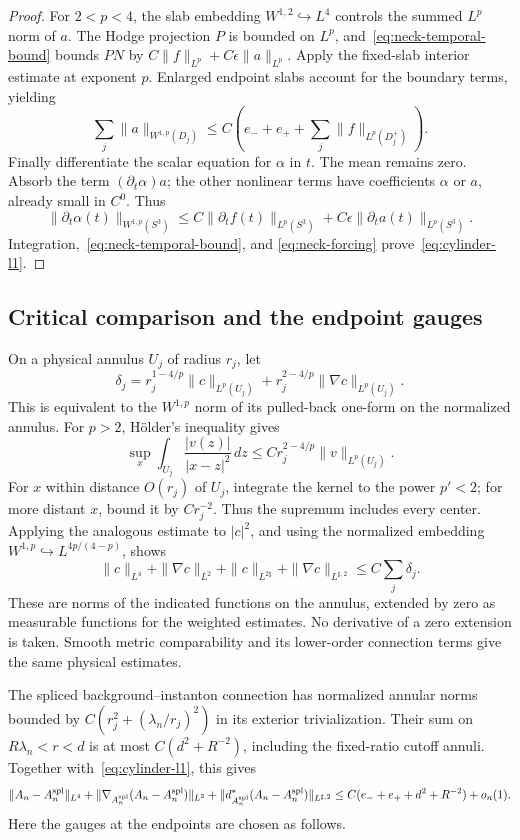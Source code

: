 \documentclass[11pt]{amsart}
\theoremstyle{definition}
\theoremstyle{remark}
\theoremstyle{plain}
\begin{document}
\begin{proof}
For $2<p<4$, the slab embedding $W^{1,2}\hookrightarrow L^4$
controls the summed $L^p$ norm of $a$.  The Hodge projection $P$
is bounded on $L^p$, and~\eqref{eq:neck-temporal-bound} bounds
$PN$ by $C\|f\|_{L^p}+C\epsilon\|a\|_{L^p}$.
Apply the fixed-slab interior estimate at exponent $p$.  Enlarged
endpoint slabs account for the boundary terms, yielding
\[
 \sum_j\|a\|_{W^{1,p}(D_j)}
 \le C\left(e_-+e_++\sum_j\|f\|_{L^p(D_j^+)}\right).
\]
Finally differentiate the scalar equation for $\alpha$ in $t$.
The mean remains zero.  Absorb the term $(\partial_t\alpha)a$;
the other nonlinear terms have coefficients $\alpha$ or $a$,
already small in $C^0$.  Thus
\[
 \|\partial_t\alpha(t)\|_{W^{1,p}(S^3)}
 \le C\|\partial_tf(t)\|_{L^p(S^3)}
       +C\epsilon\|\partial_ta(t)\|_{L^p(S^3)}.
\]
Integration,~\eqref{eq:neck-temporal-bound}, and
\eqref{eq:neck-forcing} prove~\eqref{eq:cylinder-l1}.
\end{proof}

\subsection{Critical comparison and the endpoint gauges}
On a physical annulus $U_j$ of radius $r_j$, let
\[
 \delta_j=r_j^{1-4/p}\|c\|_{L^p(U_j)}
          +r_j^{2-4/p}\|\nabla c\|_{L^p(U_j)}.
\]
This is equivalent to the $W^{1,p}$ norm of its pulled-back one-form
on the normalized annulus.  For $p>2$, H\"older's inequality gives
\begin{equation}\label{eq:neck-weighted-shell}
 \sup_x\int_{U_j}\frac{|v(z)|}{|x-z|^2}\,dz
 \le Cr_j^{2-4/p}\|v\|_{L^p(U_j)}.
\end{equation}
For $x$ within distance $O(r_j)$ of $U_j$, integrate the kernel
to the power $p'<2$; for more distant $x$, bound it by $Cr_j^{-2}$.
Thus the supremum includes every center.  Applying the analogous
estimate to $|c|^2$, and using the normalized embedding
$W^{1,p}\hookrightarrow L^{4p/(4-p)}$, shows
\begin{equation}\label{eq:neck-critical-sum}
 \|c\|_{L^4}+\|\nabla c\|_{L^2}
 +\|c\|_{L^{2\sharp}}+\|\nabla c\|_{L^{\sharp,2}}
 \le C\sum_j\delta_j.
\end{equation}
These are norms of the indicated functions on the annulus, extended
by zero as measurable functions for the weighted estimates.  No
derivative of a zero extension is taken.  Smooth metric comparability
and its lower-order connection terms give the same physical estimates.

The spliced background--instanton connection has normalized annular
norms bounded by $C(r_j^2+(\lambda_n/r_j)^2)$ in its exterior
trivialization.  Their sum on $R\lambda_n<r<d$ is at most
$C(d^2+R^{-2})$, including the fixed-ratio cutoff annuli.
Together with~\eqref{eq:cylinder-l1}, this gives
\begin{equation}\label{eq:no-neck-strong}
 \|A_n-A_n^{\rm spl}\|_{L^4}
 +\|\nabla_{A_n^{\rm spl}}(A_n-A_n^{\rm spl})\|_{L^2}
 +\|d_{A_n^{\rm spl}}^*(A_n-A_n^{\rm spl})\|_{L^{\sharp,2}}
 \le C(e_-+e_++d^2+R^{-2})+o_n(1).
\end{equation}
Here the gauges at the endpoints are chosen as follows.
\end{document}
